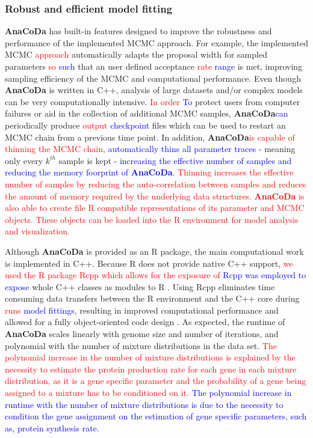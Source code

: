 \documentclass{bioinfo}
\newcommand{\package}{\textbf{AnaCoDa}\xspace} %
\begin{document}
\subsubsection*{Robust and efficient model fitting}
\package has built-in features designed to improve the robustness and performance of the implemented MCMC approach. 
For example, the implemented MCMC \textcolor{red}{approach} automatically adapts the proposal width for sampled parameters \textcolor{red}{so} \textcolor{blue}{such} that an user defined acceptance \textcolor{red}{rate} \textcolor{blue}{range} is met, improving sampling efficiency of the MCMC and computational performance.
Even though \package is written in C++, analysis of large datasets and/or complex models can be very computationally intensive.
\textcolor{red}{In order} \textcolor{blue}{To} protect users from computer failures or aid in the collection of additional MCMC samples, \package \textcolor{blue}{can} periodically produce \textcolor{red}{output} \textcolor{blue}{checkpoint} files which can be used to restart an MCMC chain from a previous time point.
In addition, \package \textcolor{red}{is capable of thinning the MCMC chain,} \textcolor{blue}{automatically thins all parameter traces - } meaning only every $k^{th}$ sample is kept \textcolor{blue}{ - increasing the effective number of samples and reducing the memory foorprint of \package}. 
\textcolor{red}{Thinning increases the effective number of samples by reducing the auto-correlation between samples and reduces the amount of memory required by the underlying data structures.
\package is also able to create file R compatible representations of its parameter and MCMC objects.
These objects can be loaded into the R environment for model analysis and visualization.}

Although \package is provided as an R package, the main computational work is implemented in C++.
Because R does not provide native C++ support, \textcolor{red}{we used the R package Rcpp which allows for the exposure of} \textcolor{blue}{Rcpp was employed to expose} whole C++ classes as modules to R \citep{rcpp_package}.
Using Rcpp eliminates time consuming data transfers between the R environment and the C++ core during \textcolor{red}{runs} \textcolor{blue}{model fittings}, resulting in improved computational performance and allowed for a fully object-oriented code design \citep{ood_book}. 
As expected, the runtime of \package scales linearly with genome size and number of iterations, and polynomial with the number of mixture distributions in the data set. 
 \textcolor{red}{The polynomial increase in the number of mixture distributions is explained by the necessity to estimate the protein production rate for each gene in each mixture distribution, as it is a gene specific parameter and the probability of a gene being assigned to a mixture has to be conditioned on it.}
\textcolor{blue}{The polynomial increase in runtime with the number of mixture distributions is due to the necessity to condition the gene assignment on the estimation of gene specific parameters, such as, protein synthesis rate.}
\end{document}
